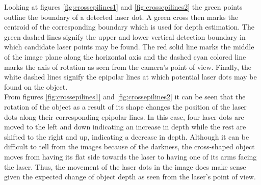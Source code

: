 Looking at figures \ref{fig:crossepilines1} and \ref{fig:crossepilines2} the green points outline the boundary of a detected laser dot. A green cross then marks the centroid of the corresponding boundary which is used for depth estimation. The green dashed lines signify the upper and lower vertical detection boundary in which candidate laser points may be found. The red solid line marks the middle of the image plane along the horizontal axis and the dashed cyan colored line marks the axis of rotation as seen from the camera's point of view. Finally, the white dashed lines signify the epipolar lines at which potential laser dots may be found on the object.\\

From figures \ref{fig:crossepilines1} and \ref{fig:crossepilines2} it can be seen that the rotation of the object as a result of its shape changes the position of the laser dots along their corresponding epipolar lines. In this case, four laser dots are moved to the left and down indicating an increase in depth while the rest are shifted to the right and up, indicating a decrease in depth. Although it can be difficult to tell from the images because of the darkness, the cross-shaped object moves from having its flat side towards the laser to having one of its arms facing the laser. Thus, the movement of the laser dots in the image does make sense given the expected change of object depth as seen from the laser's point of view.\\ 

